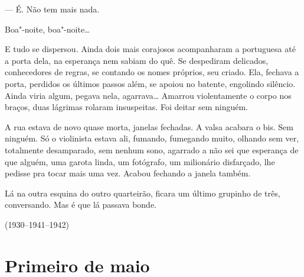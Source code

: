 \begin{linenumbers}
--- É. Não tem mais nada.

Boa"-noite, boa"-noite\ldots{}

E tudo se dispersou. Ainda dois mais corajosos acompanharam a portuguesa
até a porta dela, na esperança nem sabiam do quê. Se despediram
delicados, conhecedores de regras, se contando os nomes próprios, seu
criado. Ela, fechava a porta, perdidos os últimos passos além, se apoiou
no batente, engolindo silêncio. Ainda viria algum, pegava nela,
agarrava\ldots{} Amarrou violentamente o corpo nos braços, duas lágrimas
rolaram insuspeitas. Foi deitar sem ninguém.

A rua estava de novo quase morta, janelas fechadas. A valsa acabara o
bis. Sem ninguém. Só o violinista estava ali, fumando, fumegando muito,
olhando sem ver, totalmente desamparado, sem nenhum sono, agarrado a não
sei que esperança de que alguém, uma garota linda, um fotógrafo, um
milionário disfarçado, lhe pedisse pra tocar mais uma vez. Acabou
fechando a janela também.

Lá na outra esquina do outro quarteirão, ficara um último grupinho de
três, conversando. Mas é que lá passava bonde.

\bigskip

\hfill{}(1930--1941--1942)
\end{linenumbers}

\chapter{Primeiro de maio}

